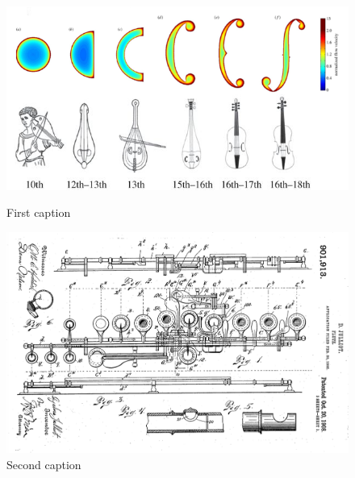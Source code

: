 \begin{figure}[!htbp]
	\centering
	\begin{minipage}{.45\linewidth}
	    \includegraphics[width=\linewidth]{gfx/06_visual_representation/f-hole.png}
	    \caption{First caption}
	    \label{img1}
	\end{minipage}
	\hspace{.05\linewidth}
	\begin{minipage}{.45\linewidth}
	    \includegraphics[width=\linewidth]{gfx/06_visual_representation/Julliot_patent.png}
	    \caption{Second caption}
	    \label{img2}
	\end{minipage}
\end{figure}


